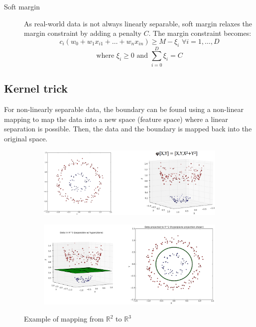 \begin{description}
        \begin{description}
            \item[Soft margin] 
                As real-world data is not always linearly separable, 
                soft margin relaxes the margin constraint by adding a penalty $C$.
                The margin constraint becomes:
                \[ c_i(w_0 + w_1 x_{i1} + \dots + w_n x_{in}) \geq M - \xi_i \,\, \forall i = 1, \dots, D \]
                \[ \text{where } \xi_i \geq 0 \text{ and } \sum_{i=0}^{D} \xi_i = C \]
        \end{description}
\end{description}


\subsection{Kernel trick}
For non-linearly separable data, the boundary can be found using a non-linear mapping 
to map the data into a new space (feature space) where a linear separation is possible.
Then, the data and the boundary is mapped back into the original space.

\begin{figure}[h]
    \begin{subfigure}{0.49\textwidth}
        \centering
        \includegraphics[width=\linewidth]{img/svm_kernel_example1.png}
    \end{subfigure}
    \begin{subfigure}{0.49\textwidth}
        \centering
        \includegraphics[width=\linewidth]{img/svm_kernel_example2.png}
    \end{subfigure}
    \caption{Example of mapping from $\mathbb{R}^2$ to $\mathbb{R}^3$}
\end{figure}

